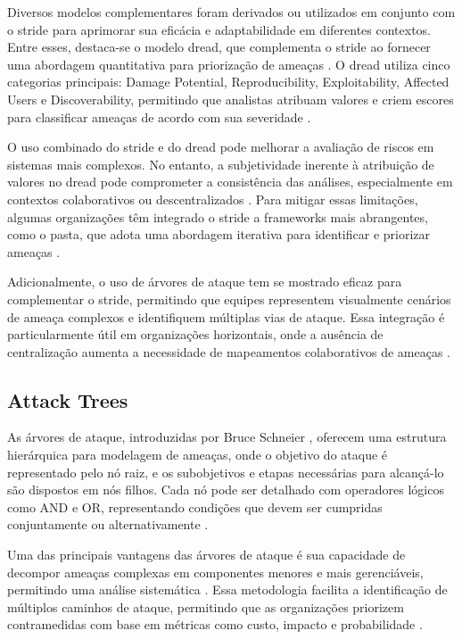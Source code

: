 Diversos modelos complementares foram derivados ou utilizados em
conjunto com o \gls{stride} para aprimorar sua eficácia e adaptabilidade em
diferentes contextos. Entre esses, destaca-se o modelo \gls{dread}, que
complementa o \gls{stride} ao fornecer uma abordagem quantitativa para
priorização de ameaças \cite{DREADful}. O \gls{dread} utiliza cinco
categorias principais: Damage Potential, Reproducibility,
Exploitability, Affected Users e Discoverability, permitindo que
analistas atribuam valores e criem escores para classificar ameaças de
acordo com sua severidade
\cite{SoftwareandattackcentricThreatModeling}.

O uso combinado do \gls{stride} e do \gls{dread} pode melhorar a avaliação de
riscos em sistemas mais complexos. No entanto, a subjetividade
inerente à atribuição de valores no \gls{dread} pode comprometer a
consistência das análises, especialmente em contextos colaborativos ou
descentralizados \cite{DREADful}. Para mitigar essas limitações,
algumas organizações têm integrado o \gls{stride} a frameworks mais
abrangentes, como o \gls{pasta}, que adota uma abordagem iterativa para identificar e
priorizar ameaças \cite{SoftwareandattackcentricThreatModeling}.

Adicionalmente, o uso de árvores de ataque tem se mostrado eficaz para
complementar o \gls{stride}, permitindo que equipes representem visualmente
cenários de ameaça complexos e identifiquem múltiplas vias de ataque.
Essa integração é particularmente útil em organizações horizontais,
onde a ausência de centralização aumenta a necessidade de mapeamentos
colaborativos de ameaças \cite{ThreatModelingdesigningForSecurity}. 

\subsection{Attack Trees}
\label{subsec:attack_trees}

As árvores de ataque, introduzidas por Bruce Schneier
\cite{AttackTrees}, oferecem uma estrutura hierárquica para modelagem
de ameaças, onde o objetivo do ataque é representado pelo nó raiz, e
os subobjetivos e etapas necessárias para alcançá-lo são dispostos em
nós filhos. Cada nó pode ser detalhado com operadores lógicos como AND
e OR, representando condições que devem ser cumpridas conjuntamente ou
alternativamente \cite{FoundationsofAttackTrees}.

Uma das principais vantagens das árvores de ataque é sua capacidade de
decompor ameaças complexas em componentes menores e mais gerenciáveis,
permitindo uma análise sistemática \cite{Energytheftdetectionissues}.
Essa metodologia facilita a identificação de múltiplos caminhos de
ataque, permitindo que as organizações priorizem contramedidas com
base em métricas como custo, impacto e probabilidade
\cite{AnAttackTreeBasedRisk}.

